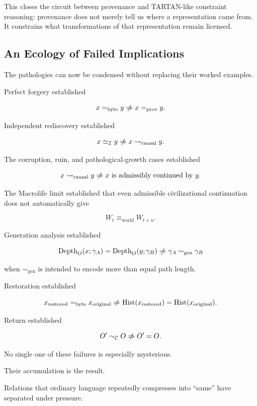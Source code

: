 \documentclass[
  11pt,
  a4paper,
  DIV=12,
  BCOR=0mm,
  parskip=half-
]{scrartcl}
\newcommand{\Inv}{\mathcal I}
\newcommand{\eqbyte}{=_{\mathrm{byte}}}
\newcommand{\eqprov}{=_{\mathrm{prov}}}
\newcommand{\simI}{\simeq_{\Inv}}
\newcommand{\simconstraint}{\sim_{\mathcal C}}
\newcommand{\leadcausal}{%
  \mathrel{\rightsquigarrow_{\mathrm{causal}}}%
}
\newcommand{\eqworld}{%
  \equiv_{\mathrm{world}}%
}
\newcommand{\Depth}{\operatorname{Depth}}
\newcommand{\Hist}{\operatorname{Hist}}
\newcommand{\nimplies}{%
  \centernot\Rightarrow
}
\theoremstyle{definition}
\theoremstyle{plain}
\theoremstyle{remark}
\begin{document}
This closes the circuit between provenance and TARTAN-like constraint
reasoning: provenance does not merely tell us where a representation came
from. It constrains what transformations of that representation remain
licensed.


\subsection{An Ecology of Failed Implications}
\label{sec:failed-implications}

The pathologies can now be condensed without replacing their worked examples.

Perfect forgery established

\[
  x\eqbyte y
  \nimplies
  x\eqprov y.
\]

Independent rediscovery established

\[
  x\simI y
  \nimplies
  x\leadcausal y.
\]

The corruption, ruin, and pathological-growth cases established

\[
  x\leadcausal y
  \nimplies
  x\text{ is admissibly continued by }y.
\]

The Macrolife limit established that even admissible civilizational
continuation does not automatically give

\[
  W_t\eqworld W_{t+n}.
\]

Generation analysis established

\[
  \Depth_O(x;\gamma_A)
  =
  \Depth_O(y;\gamma_B)
  \nimplies
  \gamma_A\sim_{\mathrm{gen}}\gamma_B
\]

when \(\sim_{\mathrm{gen}}\) is intended to encode more than equal path length.

Restoration established

\[
  x_{\mathrm{restored}}\eqbyte x_{\mathrm{original}}
  \nimplies
  \Hist(x_{\mathrm{restored}})
  =
  \Hist(x_{\mathrm{original}}).
\]

Return established

\[
  O'\simconstraint O
  \nimplies
  O'=O.
\]

No single one of these failures is especially mysterious.

Their accumulation is the result.

Relations that ordinary language repeatedly compresses into \enquote{same}
have separated under pressure.
\end{document}
